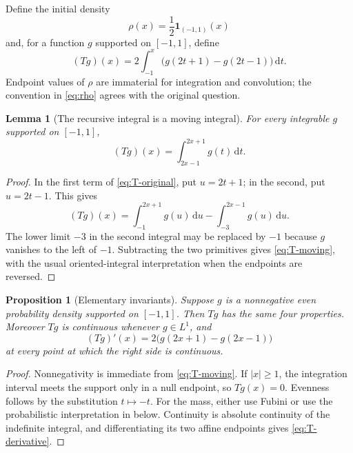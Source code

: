 \documentclass[11pt,oneside]{article}
\newtheorem{proposition}[theorem]{Proposition}
\newtheorem{lemma}[theorem]{Lemma}
\theoremstyle{definition}
\theoremstyle{remark}
\newcommand{\dd}{\,\mathrm d}
\begin{document}
Define the initial density
\begin{equation}
 \rho(x)=\frac12\mathbf 1_{(-1,1)}(x)                       \label{eq:rho}
\end{equation}
and, for a function $g$ supported on $[-1,1]$, define
\begin{equation}
 (Tg)(x)=2\int_{-1}^{x}\bigl(g(2t+1)-g(2t-1)\bigr)\dd t.   \label{eq:T-original}
\end{equation}
Endpoint values of $\rho$ are immaterial for integration and convolution; the convention in
\eqref{eq:rho} agrees with the original question.

\begin{lemma}[The recursive integral is a moving integral]
\label{lem:moving-integral}
For every integrable $g$ supported on $[-1,1]$,
\begin{equation}
 (Tg)(x)=\int_{2x-1}^{2x+1}g(t)\dd t.                       \label{eq:T-moving}
\end{equation}
\end{lemma}

\begin{proof}
In the first term of \eqref{eq:T-original}, put $u=2t+1$; in the second, put $u=2t-1$.
This gives
\[
 (Tg)(x)=\int_{-1}^{2x+1}g(u)\dd u-\int_{-3}^{2x-1}g(u)\dd u.
\]
The lower limit $-3$ in the second integral may be replaced by $-1$ because $g$ vanishes to
the left of $-1$.  Subtracting the two primitives gives \eqref{eq:T-moving}, with the usual
oriented-integral interpretation when the endpoints are reversed.
\end{proof}

\begin{proposition}[Elementary invariants]
\label{prop:invariants}
Suppose $g$ is a nonnegative even probability density supported on $[-1,1]$.  Then $Tg$ has
the same four properties.  Moreover $Tg$ is continuous whenever $g\in L^1$, and
\begin{equation}
 (Tg)'(x)=2\bigl(g(2x+1)-g(2x-1)\bigr)                     \label{eq:T-derivative}
\end{equation}
at every point at which the right side is continuous.
\end{proposition}

\begin{proof}
Nonnegativity is immediate from \eqref{eq:T-moving}.  If $|x|\ge1$, the integration interval
meets the support only in a null endpoint, so $Tg(x)=0$.  Evenness follows by the substitution
$t\mapsto-t$.  For the mass, either use Fubini or use the probabilistic interpretation in
 below.  Continuity is absolute continuity of the indefinite integral,
and differentiating its two affine endpoints gives \eqref{eq:T-derivative}.
\end{proof}
\end{document}
